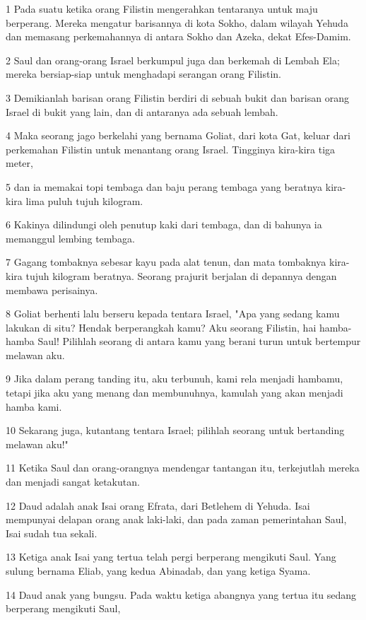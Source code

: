 \par 1 Pada suatu ketika orang Filistin mengerahkan tentaranya untuk maju berperang. Mereka mengatur barisannya di kota Sokho, dalam wilayah Yehuda dan memasang perkemahannya di antara Sokho dan Azeka, dekat Efes-Damim.
\par 2 Saul dan orang-orang Israel berkumpul juga dan berkemah di Lembah Ela; mereka bersiap-siap untuk menghadapi serangan orang Filistin.
\par 3 Demikianlah barisan orang Filistin berdiri di sebuah bukit dan barisan orang Israel di bukit yang lain, dan di antaranya ada sebuah lembah.
\par 4 Maka seorang jago berkelahi yang bernama Goliat, dari kota Gat, keluar dari perkemahan Filistin untuk menantang orang Israel. Tingginya kira-kira tiga meter,
\par 5 dan ia memakai topi tembaga dan baju perang tembaga yang beratnya kira-kira lima puluh tujuh kilogram.
\par 6 Kakinya dilindungi oleh penutup kaki dari tembaga, dan di bahunya ia memanggul lembing tembaga.
\par 7 Gagang tombaknya sebesar kayu pada alat tenun, dan mata tombaknya kira-kira tujuh kilogram beratnya. Seorang prajurit berjalan di depannya dengan membawa perisainya.
\par 8 Goliat berhenti lalu berseru kepada tentara Israel, "Apa yang sedang kamu lakukan di situ? Hendak berperangkah kamu? Aku seorang Filistin, hai hamba-hamba Saul! Pilihlah seorang di antara kamu yang berani turun untuk bertempur melawan aku.
\par 9 Jika dalam perang tanding itu, aku terbunuh, kami rela menjadi hambamu, tetapi jika aku yang menang dan membunuhnya, kamulah yang akan menjadi hamba kami.
\par 10 Sekarang juga, kutantang tentara Israel; pilihlah seorang untuk bertanding melawan aku!"
\par 11 Ketika Saul dan orang-orangnya mendengar tantangan itu, terkejutlah mereka dan menjadi sangat ketakutan.
\par 12 Daud adalah anak Isai orang Efrata, dari Betlehem di Yehuda. Isai mempunyai delapan orang anak laki-laki, dan pada zaman pemerintahan Saul, Isai sudah tua sekali.
\par 13 Ketiga anak Isai yang tertua telah pergi berperang mengikuti Saul. Yang sulung bernama Eliab, yang kedua Abinadab, dan yang ketiga Syama.
\par 14 Daud anak yang bungsu. Pada waktu ketiga abangnya yang tertua itu sedang berperang mengikuti Saul,
